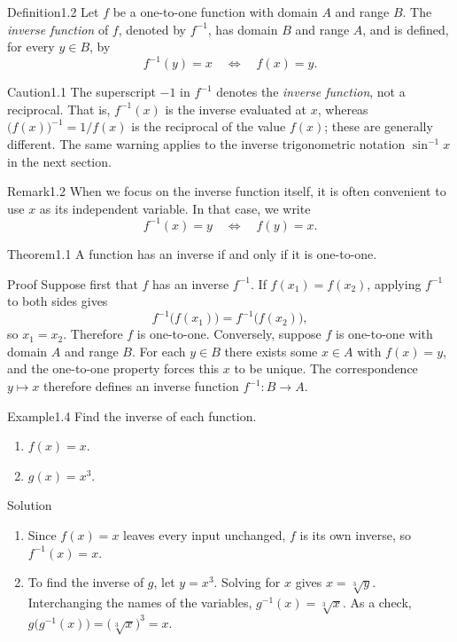 \documentclass[a4paper,12pt,oneside]{memoir}
\begin{document}
\begin{envdefinition}{Definition}{1.2}{}
Let \(f\) be a one-to-one function with domain \(A\) and range \(B\). The \emph{inverse function} of \(f\), denoted by \(f^{-1}\), has domain \(B\) and range \(A\), and is defined, for every \(y \in B\), by \[ f^{-1}(y) = x \quad \Longleftrightarrow \quad f(x) = y. \]
\end{envdefinition}
\begin{envcaution}{Caution}{1.1}{}
The superscript \(-1\) in \(f^{-1}\) denotes the \emph{inverse function}, not a reciprocal. That is, \(f^{-1}(x)\) is the inverse evaluated at \(x\), whereas \(\bigl(f(x)\bigr)^{-1} = 1 / f(x)\) is the reciprocal of the value \(f(x)\); these are generally different. The same warning applies to the inverse trigonometric notation \(\sin^{-1} x\) in the next section.
\end{envcaution}
\begin{envremark}{Remark}{1.2}{}
When we focus on the inverse function itself, it is often convenient to use \(x\) as its independent variable. In that case, we write \[ f^{-1}(x) = y \quad \Longleftrightarrow \quad f(y) = x. \]
\end{envremark}
\pagebreakbefore
\begin{envtheorem}{Theorem}{1.1}{}
A function has an inverse if and only if it is one-to-one.
\end{envtheorem}
\begin{envproof}{Proof}{}{}
Suppose first that \(f\) has an inverse \(f^{-1}\). If \(f(x_{1}) = f(x_{2})\), applying \(f^{-1}\) to both sides gives \[ f^{-1}\!\bigl(f(x_{1})\bigr) = f^{-1}\!\bigl(f(x_{2})\bigr), \] so \(x_{1} = x_{2}\). Therefore \(f\) is one-to-one. Conversely, suppose \(f\) is one-to-one with domain \(A\) and range \(B\). For each \(y \in B\) there exists some \(x \in A\) with \(f(x) = y\), and the one-to-one property forces this \(x\) to be unique. The correspondence \(y \mapsto x\) therefore defines an inverse function \(f^{-1} : B \to A\).
\end{envproof}
\begin{workedexample}
\begin{envexample}{Example}{1.4}{}
Find the inverse of each function.

\begin{enumerate}
  \item \(f(x) = x\).
  \item \(g(x) = x^{3}\).
\end{enumerate}
\end{envexample}
\begin{envsolution}{Solution}{}{}
\begin{enumerate}
  \item Since \(f(x) = x\) leaves every input unchanged, \(f\) is its own inverse, so \(f^{-1}(x) = x\).
  \item To find the inverse of \(g\), let \(y = x^{3}\). Solving for \(x\) gives \(x = \sqrt[3]{y}\). Interchanging the names of the variables, \(g^{-1}(x) = \sqrt[3]{x}\). As a check, \(g\!\bigl(g^{-1}(x)\bigr) = \bigl(\sqrt[3]{x}\bigr)^{3} = x\).
\end{enumerate}
\end{envsolution}
\end{workedexample}
\end{document}
